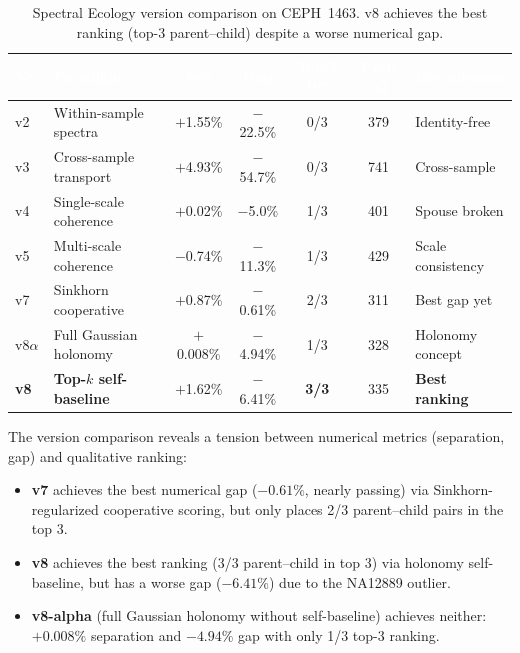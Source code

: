 \documentclass{../yalumba}
\begin{document}
\begin{table}[H]
  \centering
  \tablestyle
  \caption{Spectral Ecology version comparison on CEPH~1463.  v8 achieves
    the best ranking (top-3 parent--child) despite a worse numerical gap.}
  \label{tab:versions}
  \begin{tabular}{llccccl}
    \toprule
    \rowcolor{table-header}
    \textcolor{white}{\textbf{Ver}} &
    \textcolor{white}{\textbf{Paradigm}} &
    \textcolor{white}{\textbf{Sep}} &
    \textcolor{white}{\textbf{Gap}} &
    \textcolor{white}{\textbf{Top-3 PC}} &
    \textcolor{white}{\textbf{Prep (s)}} &
    \textcolor{white}{\textbf{Key advance}} \\
    \midrule
    v2 & Within-sample spectra
      & $+$1.55\% & $-$22.5\% & 0/3 & 379 & Identity-free \\
    v3 & Cross-sample transport
      & $+$4.93\% & $-$54.7\% & 0/3 & 741 & Cross-sample \\
    v4 & Single-scale coherence
      & $+$0.02\% & $-$5.0\% & 1/3 & 401 & Spouse broken \\
    v5 & Multi-scale coherence
      & $-$0.74\% & $-$11.3\% & 1/3 & 429 & Scale consistency \\
    v7 & Sinkhorn cooperative
      & $+$0.87\% & $-$0.61\% & 2/3 & 311 & Best gap yet \\
    v8$\alpha$ & Full Gaussian holonomy
      & $+$0.008\% & $-$4.94\% & 1/3 & 328 & Holonomy concept \\
    \textbf{v8} & \textbf{Top-$k$ self-baseline}
      & $+$1.62\% & $-$6.41\% & \textbf{3/3} & 335 & \textbf{Best ranking} \\
    \bottomrule
  \end{tabular}
\end{table}


The version comparison reveals a tension between numerical metrics
(separation, gap) and qualitative ranking:

\begin{itemize}
  \item \textbf{v7} achieves the best numerical gap ($-0.61\%$, nearly
    passing) via Sinkhorn-regularized cooperative scoring, but only places
    2/3 parent--child pairs in the top 3.
  \item \textbf{v8} achieves the best ranking (3/3 parent--child in top 3)
    via holonomy self-baseline, but has a worse gap ($-6.41\%$) due to the
    NA12889 outlier.
  \item \textbf{v8-alpha} (full Gaussian holonomy without self-baseline)
    achieves neither: $+0.008\%$ separation and $-4.94\%$ gap with only
    1/3 top-3 ranking.
\end{itemize}
\end{document}
